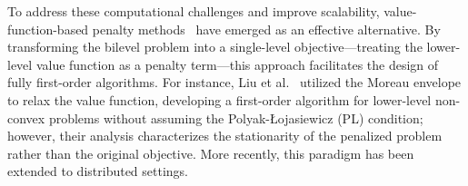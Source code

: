 \documentclass{article}
\theoremstyle{plain}
\theoremstyle{definition}
\theoremstyle{remark}
\begin{document}
To address these computational challenges and improve scalability, value-function-based penalty methods~\cite{shenfo2023, pmlr-v202-kwon23c,lufo2024,chennear2025,ji2025FO} have emerged as an effective alternative. 
By transforming the bilevel problem into a single-level objective—treating the lower-level value function as a penalty term—this approach facilitates the design of fully first-order algorithms. 
For instance, Liu et al.~ utilized the Moreau envelope to relax the value function, developing a first-order algorithm for lower-level non-convex problems without assuming the Polyak-\L{}ojasiewicz (PL) condition; however, their analysis characterizes the stationarity of the penalized problem rather than the original objective. 
More recently, this paradigm has been extended to distributed settings.




\end{document}
